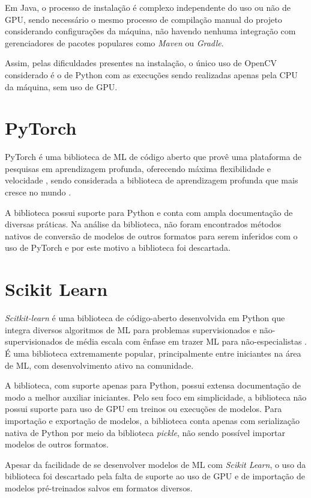 Em Java, o processo de instalação é complexo independente do uso ou não de GPU, sendo necessário o mesmo processo de compilação manual do projeto considerando configurações da máquina, não havendo nenhuma integração com gerenciadores de pacotes populares como \textit{Maven} ou \textit{Gradle}.

Assim, pelas dificuldades presentes na instalação, o único uso de OpenCV considerado é o de Python com as execuções sendo realizadas apenas pela CPU da máquina, sem uso de GPU.

\section{PyTorch}

PyTorch é uma biblioteca de ML de código aberto que provê uma plataforma de pesquisas em aprendizagem profunda, oferecendo máxima flexibilidade e velocidade \cite{pytorch_what_is}, sendo considerada a biblioteca de aprendizagem profunda que mais cresce no mundo \cite{course_fast_ai}.

A biblioteca possui suporte para Python e conta com ampla documentação de diversas práticas. Na análise da biblioteca, não foram encontrados métodos nativos de conversão de modelos de outros formatos para serem inferidos com o uso de PyTorch e por este motivo a biblioteca foi descartada.

\section{Scikit Learn}

\textit{Scitkit-learn} é uma biblioteca de código-aberto desenvolvida em Python que integra diversos algoritmos de ML para problemas supervisionados e não-supervisionados de média escala com ênfase em trazer ML para não-especialistas \cite{scikit-learn}. É uma biblioteca extremamente popular, principalmente entre iniciantes na área de ML, com desenvolvimento ativo na comunidade.

A biblioteca, com suporte apenas para Python, possui extensa documentação de modo a melhor auxiliar iniciantes. Pelo seu foco em simplicidade, a biblioteca não possui suporte para uso de GPU em treinos ou execuções de modelos. Para importação e exportação de modelos, a biblioteca conta apenas com serialização nativa de Python por meio da biblioteca \textit{pickle}, não sendo possível importar modelos de outros formatos.

Apesar da facilidade de se desenvolver modelos de ML com \textit{Scikit Learn}, o uso da biblioteca foi descartado pela falta de suporte ao uso de GPU e de importação de modelos pré-treinados salvos em formatos diversos.

